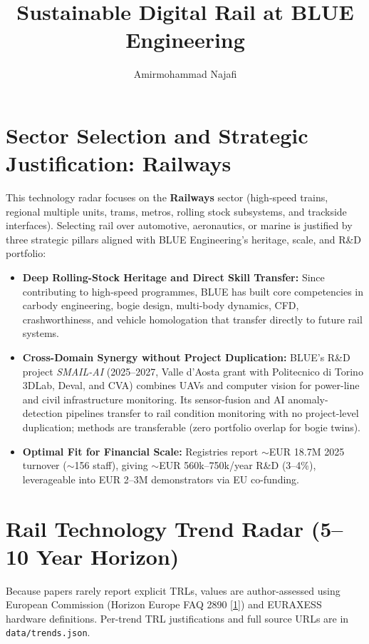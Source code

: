 \documentclass[11pt,a4paper]{article}
\title{Sustainable Digital Rail at BLUE Engineering}
\author{Amirmohammad Najafi}
\date{}
\begin{document}
\maketitle

\section{Sector Selection and Strategic Justification: Railways}
This technology radar focuses on the \textbf{Railways} sector (high-speed trains, regional multiple units, trams, metros, rolling stock subsystems, and trackside interfaces). Selecting rail over automotive, aeronautics, or marine is justified by three strategic pillars aligned with BLUE Engineering's heritage, scale, and R\&D portfolio:

\begin{itemize}
    \item \textbf{Deep Rolling-Stock Heritage and Direct Skill Transfer:} Since contributing to high-speed programmes, BLUE has built core competencies in carbody engineering, bogie design, multi-body dynamics, CFD, crashworthiness, and vehicle homologation that transfer directly to future rail systems.
    \item \textbf{Cross-Domain Synergy without Project Duplication:} BLUE's R\&D project \textit{SMAIL-AI} (2025--2027, Valle d'Aosta grant with Politecnico di Torino 3DLab, Deval, and CVA) combines UAVs and computer vision for power-line and civil infrastructure monitoring. Its sensor-fusion and AI anomaly-detection pipelines transfer to rail condition monitoring with no project-level duplication; methods are transferable (zero portfolio overlap for bogie twins).
    \item \textbf{Optimal Fit for Financial Scale:} Registries report $\sim$EUR 18.7M 2025 turnover ($\sim$156 staff), giving $\sim$EUR 560k--750k/year R\&D (3--4\%), leverageable into EUR 2--3M demonstrators via EU co-funding.
\end{itemize}

\section{Rail Technology Trend Radar (5--10 Year Horizon)}
Because papers rarely report explicit TRLs, values are author-assessed using European Commission (Horizon Europe FAQ 2890 \href{https://ec.europa.eu/info/funding-tenders/opportunities/portal/screen/support/faq/2890}{[1]}) and EURAXESS hardware definitions. Per-trend TRL justifications and full source URLs are in \texttt{data/trends.json}.
\end{document}
